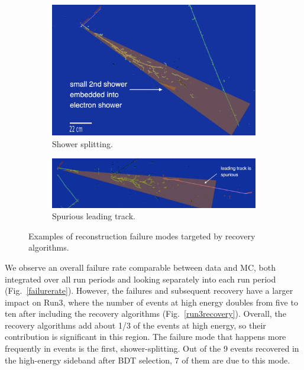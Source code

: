 \begin{figure}[H]
    \centering
    \begin{subfigure}{0.30\textwidth}
    \includegraphics[width=1.00\textwidth]{Sidebands/Figures/CutUpdates/split-shower.png}
    \caption{\label{fig:recoveryalgos:split}Shower splitting.}
    \end{subfigure}
    \begin{subfigure}{0.40\textwidth}
    \includegraphics[width=1.00\textwidth]{Sidebands/Figures/CutUpdates/spurious-track.png}
    \caption{\label{fig:recoveryalgos:spurious}Spurious leading track.}
    \end{subfigure}
    \caption{Examples of reconstruction failure modes targeted by recovery algorithms.}
    \label{fig:recoveryalgos}
\end{figure}

We observe an overall failure rate comparable between data and MC, both integrated over all run periods and looking separately into each run period (Fig.~\ref{failurerate}). However, the failures and subsequent recovery have a larger impact on Run3, where the number of events at high energy doubles from five to ten after including the recovery algorithms (Fig.~\ref{run3recovery}). Overall, the recovery algorithms add about 1/3 of the events at high energy, so their contribution is significant in this region. The failure mode that happens more frequently in \npsel events is the first, shower-splitting. Out of the 9 events recovered in the high-energy sideband after BDT selection, 7 of them are due to this mode. 

